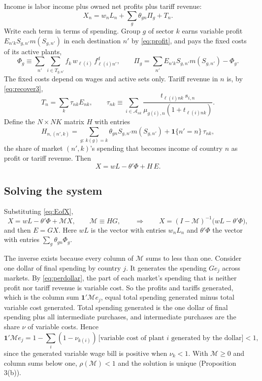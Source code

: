 \documentclass[11pt]{article}
\theoremstyle{remark}
\newcommand{\cA}{\mathcal A}
\begin{document}
Income is labor income plus owned net profits plus tariff revenue:
\[
  X_n=w_nL_n+\sum_g\theta_{gn}\Pi_g+T_n .
\]
Write each term in terms of spending. Group $g$ of sector $k$ earns variable profit
$E_{n'k}S_{g,n'}m(S_{g,n'})$ in each destination $n'$ by \eqref{eq:profit}, and pays
the fixed costs of its active plants,
\[
  \Phi_g\equiv\sum_{n'}\sum_{i\in T_{g,n'}}f_k\,w_{\ell(i)}\,f^d_{\ell(i)n'},
  \qquad
  \Pi_g=\sum_{n'}E_{n'k}S_{g,n'}m(S_{g,n'})-\Phi_g .
\]
The fixed costs depend on wages and active sets only. Tariff revenue in $n$ is, by
\eqref{eq:recover3},
\[
  T_n=\sum_k\tau_{nk}E_{nk},
  \qquad
  \tau_{nk}\equiv\sum_{i\in\cA_{nk}}\frac{t_{\ell(i)nk}\,s_{i,n}}{\mu_{g(i),n}(1+t_{\ell(i)nk})} .
\]
Define the $N\times NK$ matrix $H$ with entries
\begin{equation}
  H_{n,(n',k)}=\sum_{g:\,k(g)=k}\theta_{gn}S_{g,n'}m(S_{g,n'})+\mathbf 1\{n'=n\}\,\tau_{nk},
  \label{eq:H}
\end{equation}
the share of market $(n',k)$'s spending that becomes income of country $n$ as profit
or tariff revenue. Then
\[
  X=wL-\theta'\Phi+H\,E .
\]

\subsection{Solving the system}

Substituting \eqref{eq:EofX},
\begin{equation}
  X=wL-\theta'\Phi+\mathcal M X,
  \qquad
  \mathcal M\equiv HG,
  \qquad\Longrightarrow\qquad
  X=(I-\mathcal M)^{-1}\bigl(wL-\theta'\Phi\bigr),
  \label{eq:XofW}
\end{equation}
and then $E=GX$. Here $wL$ is the vector with entries $w_nL_n$ and $\theta'\Phi$ the
vector with entries $\sum_g\theta_{gn}\Phi_g$.

The inverse exists because every column of $\mathcal M$ sums to less than one.
Consider one dollar of final spending by country $j$. It generates the spending $Ge_j$
across markets. By \eqref{eq:perdollar}, the part of each market's spending that is
neither profit nor tariff revenue is variable cost. So the profits and tariffs
generated, which is the column sum $\mathbf 1'\mathcal Me_j$, equal total spending
generated minus total variable cost generated. Total spending generated is the one
dollar of final spending plus all intermediate purchases, and intermediate purchases
are the share $\nu$ of variable costs. Hence
\[
  \mathbf 1'\mathcal Me_j=1-\sum_{i}(1-\nu_{k(i)})\,\bigl[\text{variable cost of plant }i
  \text{ generated by the dollar}\bigr]<1,
\]
since the generated variable wage bill is positive when $\nu_k<1$. With $\mathcal M\ge0$
and column sums below one, $\rho(\mathcal M)<1$ and the solution is unique
(Proposition 3(b)).
\end{document}
